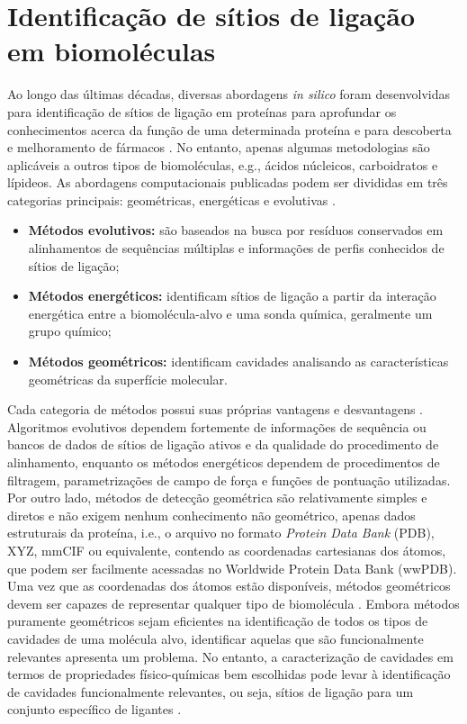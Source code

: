 \documentclass[Portugues]{phdquali}
\def\ie{i.e.\onedot}
\def\eg{e.g.\onedot}
\begin{document}
\section{Identificação de sítios de ligação em biomoléculas \label{sec:binding-sites}}

Ao longo das últimas décadas, diversas abordagens \textit{in silico} foram desenvolvidas para identificação de sítios de ligação em proteínas para aprofundar os conhecimentos acerca da função de uma determinada proteína e para descoberta e melhoramento de fármacos \cite{liang1998}. No entanto, apenas algumas metodologias são aplicáveis a outros tipos de biomoléculas, \eg, ácidos núcleicos, carboidratos e lípideos. As abordagens computacionais publicadas podem ser divididas em três categorias principais: geométricas, energéticas e evolutivas \cite{oliveira2014,simoes2017}.

\begin{itemize}
  \item \textbf{Métodos evolutivos:} são baseados na busca por resíduos conservados em alinhamentos de sequências múltiplas e informações de perfis conhecidos de sítios de ligação;
  \item \textbf{Métodos energéticos:} identificam sítios de ligação a partir da interação energética entre a biomolécula-alvo e uma sonda química, geralmente um grupo químico;
  \item \textbf{Métodos geométricos:} identificam cavidades analisando as características geométricas da superfície molecular.
\end{itemize}

Cada categoria de métodos possui suas próprias vantagens e desvantagens \cite{sotriffer2002,henrich2010,simoes2017,krone2016}. Algoritmos evolutivos dependem fortemente de informações de sequência ou bancos de dados de sítios de ligação ativos e da qualidade do procedimento de alinhamento, enquanto os métodos energéticos dependem de procedimentos de filtragem, parametrizações de campo de força e funções de pontuação utilizadas. Por outro lado, métodos de detecção geométrica são relativamente simples e diretos e não exigem nenhum conhecimento não geométrico, apenas dados estruturais da proteína, \ie, o arquivo no formato \textit{Protein Data Bank} (PDB), XYZ, mmCIF ou equivalente, contendo as coordenadas cartesianas dos átomos, que podem ser facilmente acessadas no Worldwide Protein Data Bank (wwPDB). Uma vez que as coordenadas dos átomos estão disponíveis, métodos geométricos devem ser capazes de representar qualquer tipo de biomolécula \cite{henrich2010,oliveira2014,simoes2017}. Embora métodos puramente geométricos sejam eficientes na identificação de todos os tipos de cavidades de uma molécula alvo, identificar aquelas que são funcionalmente relevantes apresenta um problema. No entanto, a caracterização de cavidades em termos de propriedades físico-químicas bem escolhidas pode levar à identificação de cavidades funcionalmente relevantes, ou seja, sítios de ligação para um conjunto específico de ligantes \cite{sotriffer2002,henrich2010,simoes2017,liang1998}.
\end{document}
